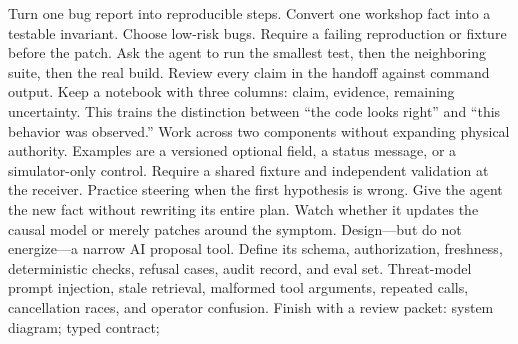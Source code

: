 Turn one bug report into reproducible steps.\markdownRendererOlItemEnd 
{}Convert one workshop fact into a testable invariant.\markdownRendererOlItemEnd 
\markdownRendererOlEnd \markdownRendererInterblockSeparator
{}
\markdownRendererSectionEnd \markdownRendererSectionBegin
{}\markdownRendererInterblockSeparator
{}Choose low-risk bugs. Require a failing reproduction or fixture before the\markdownRendererSoftLineBreak
{}patch. Ask the agent to run the smallest test, then the neighboring suite, then\markdownRendererSoftLineBreak
{}the real build. Review every claim in the handoff against command output.\markdownRendererParagraphSeparator
{}Keep a notebook with three columns: claim, evidence, remaining uncertainty.\markdownRendererSoftLineBreak
{}This trains the distinction between “the code looks right” and “this behavior\markdownRendererSoftLineBreak
{}was observed.”\markdownRendererInterblockSeparator
{}
\markdownRendererSectionEnd \markdownRendererSectionBegin
{}\markdownRendererInterblockSeparator
{}Work across two components without expanding physical authority. Examples are\markdownRendererSoftLineBreak
{}a versioned optional field, a status message, or a simulator-only control.\markdownRendererSoftLineBreak
{}Require a shared fixture and independent validation at the receiver.\markdownRendererParagraphSeparator
{}Practice steering when the first hypothesis is wrong. Give the agent the new\markdownRendererSoftLineBreak
{}fact without rewriting its entire plan. Watch whether it updates the causal\markdownRendererSoftLineBreak
{}model or merely patches around the symptom.\markdownRendererInterblockSeparator
{}
\markdownRendererSectionEnd \markdownRendererSectionBegin
{}\markdownRendererInterblockSeparator
{}Design—but do not energize—a narrow AI proposal tool. Define its schema,\markdownRendererSoftLineBreak
{}authorization, freshness, deterministic checks, refusal cases, audit record,\markdownRendererSoftLineBreak
{}and eval set. Threat-model prompt injection, stale retrieval, malformed tool\markdownRendererSoftLineBreak
{}arguments, repeated calls, cancellation races, and operator confusion.\markdownRendererParagraphSeparator
{}Finish with a review packet:\markdownRendererInterblockSeparator
{}\markdownRendererUlBegin
\markdownRendererUlItem system diagram;\markdownRendererUlItemEnd 
\markdownRendererUlItem typed contract;\markdownRendererUlItemEnd 
